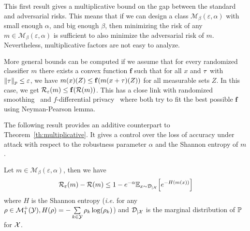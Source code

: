 This first result gives a multiplicative bound on the gap between the standard and adversarial risks. This means that if we can design a class $\mathcal{M}_{\beta}\left(\varepsilon,\alpha\right)$ with small enough $\alpha$, and big enough $\beta$, then minimizing the risk of any $m  \in \mathcal{M}_{\beta}\left(\varepsilon,\alpha\right)$ is sufficient to also minimize the adversarial risk of $m $. Nevertheless, multiplicative factors are not easy to analyze. 
\begin{rmq}
More general bounds can be computed if we assume that for every randomized classifier $m $ there exists a convex function $\mathbf{f}$ such that for all $x $ and ${\tau}$ with $\lVert{\tau}\rVert_p\leq \varepsilon$, we have $m (x )(Z)\leq \mathbf{f}(m (x +{\tau})(Z))$ for all measurable sets $Z$. In this case, we get $\risk_\varepsilon(m) \leq \mathbf{f}\left( \risk(m )\right)$. This has a close link with randomized smoothing~\citep{KolterRandomizedSmoothing} and $f$-differential privacy~\citep{dong2019gaussian} where both try to fit the best possible $\mathbf{f}$ using Neyman-Pearson lemma.
\end{rmq}

The following result provides an additive counterpart to Theorem~\ref{th:multiplicative}. It gives a control over the loss of accuracy under attack with respect to the robustness parameter $\alpha$ and the Shannon entropy of $m $.  


\begin{thm}
\label{th:RenyiboundRisk}
Let $m  \in \mathcal{M}_{\beta}\left(\varepsilon,\alpha\right)$, then we have
$$ \risk_\varepsilon(m )-\risk(m ) \leq 1-e^{-\alpha}  \mathbb{E}_{x  \sim \mathcal{D}_{\mid \XX}}\left[e^{-H(m (x ))}\right]$$
where $H$ is the Shannon entropy (\emph{i.e.} for any $\rho \in \mathcal{M}^+_1\left(\mathcal{Y}\right), H(\rho)= -\sum\limits_{k \in \YY} \rho_k \log(\rho_k)$) and $\mathcal{D}_{\mid \mathcal{X}}$ is the marginal distribution of $\mathbb{P}$ for $\mathcal{X}$.
\end{thm}

